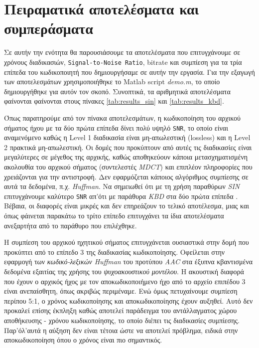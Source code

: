 \section*{Πειραματικά αποτελέσματα και συμπεράσματα}
Σε αυτήν την ενότητα θα παρουσιάσουμε τα αποτελέσματα που επιτυγχάνουμε σε
χρόνους διαδικασιών, \verb|Signal-to-Noise Ratio|, bitrate και συμπίεση για τα
τρία επίπεδα του κωδικοποιητή που δημιουργήσαμε σε αυτήν την εργασία. Για την
εξαγωγή των αποτελεσμάτων χρησιμοποιήθηκε το Matlab script \emph{demo.m}, το
οποίο δημιουργήθηκε για αυτόν τον σκοπό. Συνοπτικά, τα αριθμητικά αποτελέσματα
φαίνονται φαίνονται στους πίνακες \ref{tab:results_sin} και \ref{tab:results_kbd}.

Όπως παρατηρούμε από τον πίνακα αποτελεσμάτων, η κωδικοποίηση του αρχικού σήματος
ήχου με τα δύο πρώτα επίπεδα δίνει πολύ υψηλό \verb|SNR|, το οποίο είναι αναμενόμενο
καθώς η Level 1 διαδικασία είναι μη-απωλεστική (lossless) και η Level 2 πρακτικά
μη-απωλεστική. Οι δομές που προκύπτουν από αυτές τις διαδικασίες είναι μεγαλύτερες
σε μέγεθος της αρχικής, καθώς αποθηκεύουν κάποια μετασχηματισμένη ακολουθία του
αρχικού σήματος (συντελεστές \emph{MDCT}) και επιπλέον πληροφορίες που χρειάζονται
για την αντιστροφή. Δεν εφαρμόζεται κάποιος αλγόριθμος συμπίεσης σε αυτά τα δεδομένα,
π.χ. \emph{Huffman}. Να σημειωθεί ότι με τη χρήση παραθύρων \emph{SIN}
επιτυγχάνουμε καλύτερο \verb|SNR| απ'ότι με παράθυρα \emph{KBD} στα δύο πρώτα
επίπεδα . Βέβαια, οι διαφορές είναι μικρές και δεν επηρεάζουν το τελικό
αποτέλεσμα, μιας και όπως φάινεται παρακάτω το τρίτο επίπεδο επιτυγχάνει τα
ίδια αποτελέσματα ανεξαρτήτα από το παράθυρο που επιλέχθηκε.

Η συμπίεση του αρχικού ηχητικού σήματος επιτυγχάνεται ουσιαστικά στην δομή που
προκύπτει από το επίπεδο 3 της διαδικασίας κωδικοποίησης. Οφείλεται στην εφαρμογή
των \emph{κωδικό-λεξικών Huffman} του προτύπου \emph{AAC} στα έξυπνα κβαντισμένα
δεδομένα εξαιτίας της χρήσης του \emph{ψυχοακουστικού μοντέλου}. Η ακουστική
διαφορά που έχουν ο αρχικός ήχος με τον αποκωδικοποιήμενο ήχο από το αρχείο επιπέδου
3 είναι ανεπαίσθητη, όπως ακριβώς περιμέναμε. Ενώ όμως πετυχαίνουμε συμπίεση περίπου
5:1, ο χρόνος κωδικοποίησης και αποκωδικοποίησης έχουν αυξηθεί. Αυτό δεν προκαλεί
επίσης έκπληξη καθώς αποτελεί παράδειγμα του αντάλλαγματος χώρου αποθήκευσης -
χρόνου κωδικοποίησης, το οποίο διέπει τις διαδικασίες συμπίεσης. Παρ'όλ'αυτά η
αύξηση δεν είναι τέτοια ώστε να αποτελεί πρόβλημα, ειδικά στην αποκωδικοποίηση
όπου ο χρόνος είναι πιο σημαντικός.

